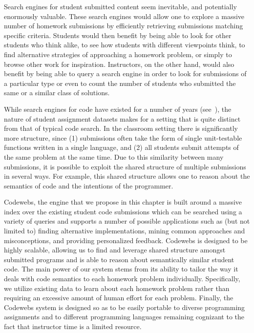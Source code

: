Search engines for student submitted content seem inevitable, and potentially enormously valuable. 
		These search engines would allow one to explore a massive number of homework submissions by efficiently retrieving submissions matching specific criteria.
Students would then benefit by being able to look for other students who think alike,
			 to see how students with different viewpoints think,
			to find alternative strategies of approaching a homework problem,
			or simply to browse other work for inspiration.
Instructors, on the other hand, would also benefit 
by being able to query a search engine in order to look for submissions of a particular
			type or even to count the number of students who submitted the same
			or a similar class of solutions.


While search engines for code have existed for a number of years (see~\cite{paul94,thummalapenta07,hummel08,kim10}),
the nature of student assignment datasets makes for a setting that is quite distinct from that of typical code search.
In the classroom setting there is significantly more structure, since
(1)  submissions often take the form of single unit-testable functions written in a single language, and (2) 
all students submit attempts of the same problem at the same time.   
Due to this similarity between many submissions, 
it is possible to exploit the shared structure of multiple submissions in several ways.
For example, this shared structure allows one to reason about the
semantics of code and the intentions of the programmer.   


Codewebs, the engine that we propose in this chapter is built around a massive index over the existing student code submissions
which can be searched using a variety of queries and supports a number of possible applications such as (but not limited to)
finding alternative implementations, mining common approaches and misconceptions, and providing personalized feedback.
Codewebs is designed to be highly scalable, allowing us to
find and leverage shared structure amongst submitted programs and is able to reason about semantically similar student code.
The main power of our system stems from its ability to tailor the way it deals with code semantics to each homework problem individually.
Specifically, we
utilize existing data to learn about each homework problem rather than requiring an excessive amount of human effort for each problem.
Finally, the Codewebs system is designed so as to be easily portable to diverse programming assignments
and to different programming languages remaining cognizant to the fact that instructor time is a limited resource.


